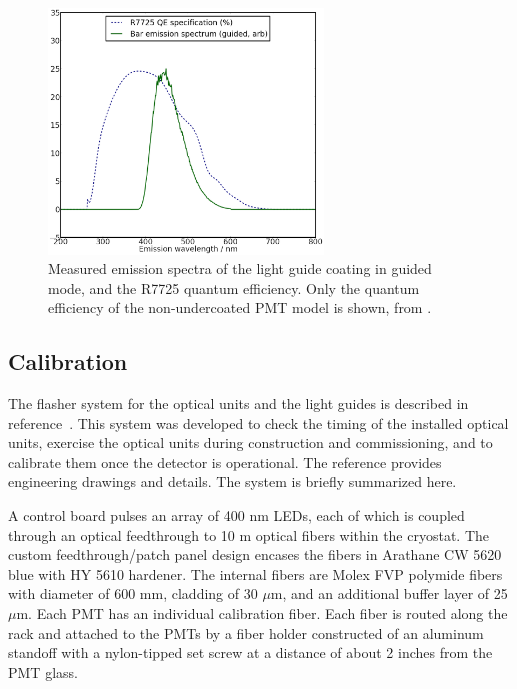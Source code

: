 \begin{figure}[t]
\centering 
\includegraphics[width=0.65\textwidth]{./light_figures/BarSpectra.png}
\caption{Measured emission spectra of the light guide coating in guided mode, and the R7725 quantum efficiency.  Only the quantum efficiency of the non-undercoated PMT model is shown, from \cite{Hamamatsu-Datasheet2inch}.
 \label{fig:TPBSpectra}  }
\end{figure}

\subsection{Calibration}

The flasher system for the optical units and the light guides is described in reference~\cite{Conrad:2015xta}. This system was developed to check the timing of the installed optical units, exercise the optical units during construction and commissioning, and to calibrate them once the detector is operational.  The reference provides engineering drawings and details.  The system is briefly summarized here.

A control board pulses an array of 400 nm LEDs, each of which is
coupled through an optical feedthrough to 10 m optical fibers within the cryostat.  The custom feedthrough/patch panel design encases the fibers in Arathane CW 5620 blue with HY 5610 hardener.  The internal fibers are Molex FVP polymide fibers with diameter of 600 mm, cladding of 30 $\mu$m, and an additional buffer layer of 25 $\mu$m.  Each PMT has an individual calibration fiber.  Each fiber is routed along the rack  and attached to the PMTs by a fiber holder constructed of an aluminum standoff with a nylon-tipped set screw at a distance of about 2 inches from the PMT glass.


